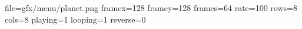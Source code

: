 file=gfx/menu/planet.png
framex=128
framey=128
frames=64
rate=100
rows=8
cols=8
playing=1
looping=1
reverse=0
